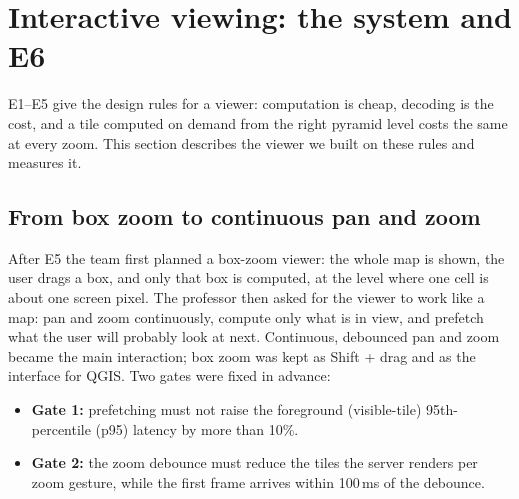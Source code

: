 \documentclass[11pt,a4paper]{article}
\begin{document}
\section{Interactive viewing: the system and E6}\label{sec:viewer}
E1--E5 give the design rules for a viewer: computation is cheap, decoding is the cost, and a tile computed on demand
from the right pyramid level costs the same at every zoom. This section describes the viewer we built on these rules
and measures it.

\subsection{From box zoom to continuous pan and zoom}
After E5 the team first planned a box-zoom viewer: the whole map is shown, the user drags a box, and only that box is
computed, at the level where one cell is about one screen pixel. The professor then asked for the viewer to work like
a map: pan and zoom continuously, compute only what is in view, and prefetch what the user will probably look at
next. Continuous, debounced pan and zoom became the main interaction; box zoom was kept as Shift + drag and as the
interface for QGIS. Two gates were fixed in advance:
\begin{itemize}
  \item \textbf{Gate 1:} prefetching must not raise the foreground (visible-tile) 95th-percentile (p95) latency by
  more than 10\%.
  \item \textbf{Gate 2:} the zoom debounce must reduce the tiles the server renders per zoom gesture, while the first
  frame arrives within 100\,ms of the debounce.
\end{itemize}
\end{document}

